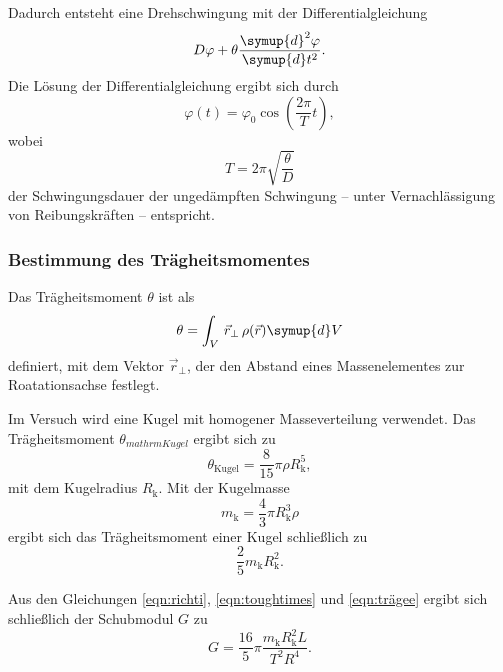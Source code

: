 Dadurch entsteht eine Drehschwingung mit der Differentialgleichung
\begin{equation}
	D \varphi + \theta \frac{\symup{d}^2 \varphi}{\symup{d} t^2} \mathrm{.}
\end{equation}
Die Lösung der Differentialgleichung ergibt sich durch
\begin{equation}
	\varphi(t) = \varphi_0 \cos(\frac{2\pi}{T} t) \mathrm{,}
\end{equation}
wobei
\begin{equation}
	\label{eqn:toughtimes}
	T = 2\pi \sqrt{\frac{\theta}{D}}
\end{equation}
der Schwingungsdauer der ungedämpften Schwingung -- unter Vernachlässigung von
Reibungskräften -- entspricht.

\subsubsection{Bestimmung des Trägheitsmomentes}

Das Trägheitsmoment $\theta$ ist als
\begin{equation*}
	\theta = \int_V \, \vec{r}_{\perp} \, \rho(\vec{r}) \symup{d} V
\end{equation*}
definiert, mit dem Vektor $\vec{r}_{\perp}$, der den Abstand eines Massenelementes zur
Roatationsachse festlegt.

Im Versuch wird eine Kugel mit homogener Masseverteilung verwendet.
Das Trägheitsmoment $\theta_{mathrm{Kugel}}$ ergibt sich zu
\begin{equation*}
	\theta_{\mathrm{Kugel}} = \frac{8}{15} \pi \rho R_{\mathrm{k}}^5 \mathrm{,}
\end{equation*}
mit dem Kugelradius $R_{\mathrm{k}}$.
Mit der Kugelmasse
\begin{equation*}
	m_{\mathrm{k}} = \frac{4}{3} \pi R_{\mathrm{k}}^3 \rho
\end{equation*}
ergibt sich das Trägheitsmoment einer Kugel schließlich zu
\begin{equation}
	\label{eqn:trägee}
	\frac{2}{5} m_{\mathrm{k}} R_{\mathrm{k}}^2 \mathrm{.}
\end{equation}

Aus den Gleichungen \eqref{eqn:richti}, \eqref{eqn:toughtimes} und \eqref{eqn:trägee} ergibt
sich schließlich der Schubmodul $G$ zu
\begin{equation}
	\label{eqn:schubischu}
	G = \frac{16}{5} \pi \frac{m_{\mathrm{k}} R_{\mathrm{k}}^2 L}{T^2 R^4} \mathrm{.}
\end{equation}


